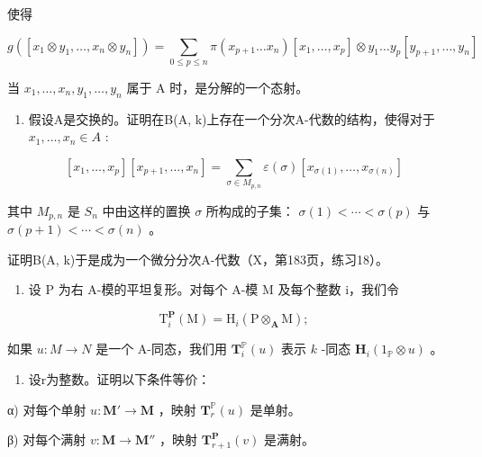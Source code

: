 使得

\[
g \left(\left[ x _ {1} \otimes y _ {1}, \dots , x _ {n} \otimes y _ {n} \right]\right) = \sum_ {0 \leqslant p \leqslant n} \pi \left(x _ {p + 1} \dots x _ {n}\right) \left[ x _ {1}, \dots , x _ {p} \right] \otimes y _ {1} \dots y _ {p} \left[ y _ {p + 1}, \dots , y _ {n} \right]
\]

当 \(x_{1},\ldots,x_{n},y_{1},\ldots,y_{n}\) 属于 A 时，是分解的一个态射。

\begin{enumerate}
\def\labelenumi{\alph{enumi})}
\setcounter{enumi}{1}
\tightlist
\item
  假设A是交换的。证明在B(A, k)上存在一个分次A-代数的结构，使得对于 \(x_{1}, \ldots, x_{n} \in A\) :
\end{enumerate}

\[
\left[ x _ {1}, \dots , x _ {p} \right] \left[ x _ {p + 1}, \dots , x _ {n} \right] = \sum_ {\sigma \in M _ {p, n}} \varepsilon (\sigma) \left[ x _ {\sigma (1)}, \dots , x _ {\sigma (n)} \right]
\]

其中 \(M_{p,n}\) 是 \(S_{n}\) 中由这样的置换 \(\sigma\) 所构成的子集： \(\sigma(1) < \cdots < \sigma(p)\) 与 \(\sigma(p + 1) < \cdots < \sigma(n)\) 。

证明B(A, k)于是成为一个微分分次A-代数（X，第183页，练习18）。

\begin{enumerate}
\def\labelenumi{\arabic{enumi})}
\setcounter{enumi}{5}
\tightlist
\item
  设 P 为右 A-模的平坦复形。对每个 A-模 M 及每个整数 i，我们令
\end{enumerate}

\[
\mathrm{T} _ {i} ^ {\mathbf {P}} (\mathrm{M}) = \mathrm{H} _ {i} (\mathrm{P} \otimes_ {\mathbf {A}} \mathrm{M});
\]

如果 \(u:M\to N\) 是一个 A-同态，我们用 \(\mathbf{T}_{i}^{\mathbb{P}}(u)\) 表示 \(k\) -同态 \(\mathbf{H}_{i}(1_{\mathbb{P}}\otimes u)\) 。

\begin{enumerate}
\def\labelenumi{\alph{enumi})}
\tightlist
\item
  设r为整数。证明以下条件等价：
\end{enumerate}

α) 对每个单射 \(u: \mathbf{M}' \to \mathbf{M}\) ，映射 \(\mathbf{T}_{r}^{\mathbb{P}}(u)\) 是单射。

β) 对每个满射 \(v: \mathbf{M} \to \mathbf{M}''\) ，映射 \(\mathbf{T}_{r+1}^{\mathbf{P}}(v)\) 是满射。

